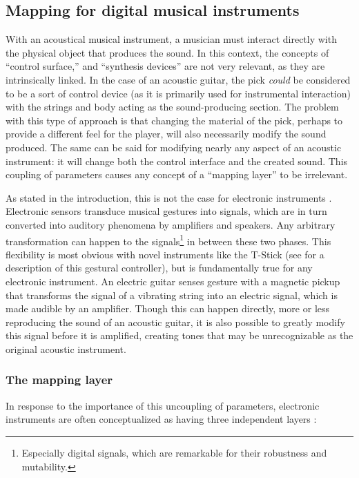 \subsection{Mapping for digital musical instruments} \label{sec:mappingforDMIs}

With an acoustical musical instrument, a musician must interact directly with the physical object that produces the sound. In this context, the concepts of ``control surface,'' and ``synthesis devices'' are not very relevant, as they are intrinsically linked. In the case of an acoustic guitar, the pick \emph{could} be considered to be a sort of control device (as it is primarily used for instrumental interaction) with the strings and body acting as the sound-producing section. The problem with this type of approach is that changing the material of the pick, perhaps to provide a different feel for the player, will also necessarily modify the sound produced. The same can be said for modifying nearly any aspect of an acoustic instrument: it will change both the control interface and the created sound. This coupling of parameters causes any concept of a ``mapping layer'' to be irrelevant.

As stated in the introduction, this is not the case for electronic instruments . Electronic sensors transduce musical gestures into signals, which are in turn converted into auditory phenomena by amplifiers and speakers. Any arbitrary transformation can happen to the signals\footnote{Especially digital signals, which are remarkable for their robustness and mutability.} in between these two phases. This flexibility is most obvious with novel instruments like the T-Stick (see  for a description of this gestural controller), but is fundamentally true for any electronic instrument. An electric guitar senses gesture with a magnetic pickup that transforms the signal of a vibrating string into an electric signal, which is made audible by an amplifier. Though this can happen directly, more or less reproducing the sound of an acoustic guitar, it is also possible to greatly modify this signal before it is amplified, creating tones that may be unrecognizable as the original acoustic instrument.

	\subsubsection{The mapping layer}

In response to the importance of this uncoupling of parameters, electronic instruments are often conceptualized as having three independent layers \cite{gestural_control_sound_synthesis}: 

